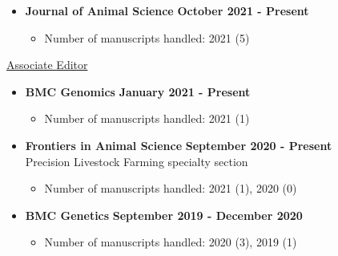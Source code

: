 \documentclass[margin,line,10pt]{res}
\begin{document}
\begin{resume}
\begin{itemize}
\item {\bf Journal of Animal Science} \hfill {\bf October 2021 - Present}
  \begin{itemize}
    \item Number of manuscripts handled: 2021 (5)
  \end{itemize}
\end{itemize}


\underline{Associate Editor}
\vspace{0.2cm}



\begin{itemize}
\item {\bf BMC Genomics} \hfill {\bf January 2021 - Present}
  \begin{itemize}
    \item Number of manuscripts handled: 2021 (1)
  \end{itemize}
\end{itemize}

\vspace{0.3cm}

\begin{itemize}
\item {\bf Frontiers in Animal Science} \hfill {\bf September 2020 - Present} \\
   Precision Livestock Farming specialty section
  \begin{itemize}
    \item Number of manuscripts handled: 2021 (1), 2020 (0)
  \end{itemize}
\end{itemize}

\vspace{0.3cm}

\begin{itemize}
\item {\bf BMC Genetics} \hfill {\bf September 2019 - December 2020}
  \begin{itemize}
    \item Number of manuscripts handled: 2020 (3), 2019 (1)
  \end{itemize}
\end{itemize}


\end{resume}
\end{document}
